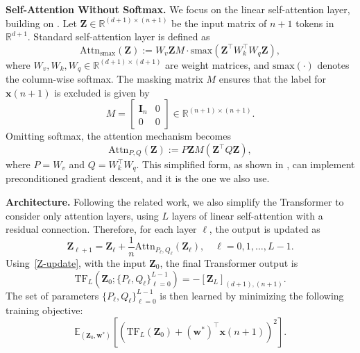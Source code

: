 \documentclass[11pt]{article}
\theoremstyle{plain}
\theoremstyle{definition}
\theoremstyle{remark}
\numberwithin{equation}{section}
\begin{document}
\textbf{Self-Attention Without Softmax.} We focus on the linear self-attention layer, building on \citep{schlag2021linear, von2023transformers}. Let \(\mathbf{Z} \in \mathbb{R}^{(d+1) \times (n+1)}\) be the input matrix of \(n+1\) tokens in \(\mathbb{R}^{d+1}\). Standard self-attention layer is defined as
\begin{equation}
\text{Attn}_{\text{smax}}(\mathbf{Z}) := W_v \mathbf{Z} M \cdot \text{smax}(\mathbf{Z}^{\top} W_k^{\top} W_q \mathbf{Z}),
\end{equation}
where \(W_v, W_k, W_q \in \mathbb{R}^{(d+1) \times (d+1)}\) are weight matrices, and \(\text{smax}(\cdot)\) denotes the column-wise softmax. The masking matrix \(M\) ensures that the label for \(\mathbf{x}(n+1)\) is excluded is given by
\begin{equation}
M = 
\begin{bmatrix}
\mathbf{I}_n & 0 \\
0 & 0
\end{bmatrix} \in \mathbb{R}^{(n+1) \times (n+1)}.
\end{equation}
Omitting softmax, the attention mechanism becomes
\begin{equation}
\label{eq:attention}
\text{Attn}_{P, Q} (\mathbf{Z}) := P \mathbf{Z} M (\mathbf{Z}^{\top} Q \mathbf{Z}),
\end{equation}
where \(P = W_v\) and \(Q = W_k^{\top} W_q\). This simplified form, as shown in \cite{ahn2024transformers}, can implement preconditioned gradient descent, and it is the one we also use.

\textbf{Architecture.} Following the related work, we also simplify the Transformer to consider only attention layers, using \(L\) layers of linear self-attention with a residual connection. Therefore, for each layer \(\ell\), the output is updated as
\begin{equation}
\mathbf{Z}_{\ell+1} = \mathbf{Z}_\ell + \frac{1}{n} \text{Attn}_{P_\ell, Q_\ell} (\mathbf{Z}_\ell), \quad \ell = 0, 1, \dots, L-1.
\label{Z-update}
\end{equation}
Using~\eqref{Z-update}, with the input $\mathbf{Z}_0$, the final Transformer output is
\begin{equation}
\text{TF}_L(\mathbf{Z}_0; \{P_\ell, Q_\ell\}_{\ell=0}^{L-1}) = -[\mathbf{Z}_L]_{(d+1), (n+1)}.
\end{equation}
The set of parameters $\{P_\ell, Q_\ell\}_{\ell=0}^{L-1}$ is then learned by minimizing the following training objective: \begin{equation}
\mathbb{E}_{(\mathbf{Z}_0, \mathbf{w}^*)} \left[\left( \text{TF}_L(\mathbf{Z}_0) + (\mathbf{w}^{*})^{\top} \mathbf{x}(n+1) \right)^2 \right].
\label{in-context_f}
\end{equation}
\end{document}
